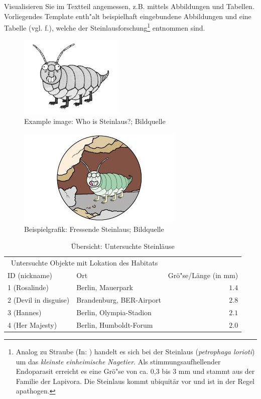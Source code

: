 Visualisieren Sie im Textteil angemessen, z.B. mittels Abbildungen und Tabellen. Vorliegendes Template enth"alt beispielhaft eingebundene Abbildungen und eine Tabelle (vgl. f.), welche der Steinlausforschung\footnote{Analog zu Straube (In: \autocite{pschy}) handelt es sich bei der Steinlaus (\textit{petrophaga lorioti}) um das \frqq \textit{kleinste einheimische Nagetier}\flqq. Als stimmungsaufhellender Endoparasit erreicht es eine Gr\"o"se von ca. 0,3 bis 3 mm und stammt aus der Familie der Lapivora. Die Steinlaus kommt ubiquit\"ar vor und ist in der Regel apathogen.} entnommen sind.


\begin{figure}
\centering
\includegraphics{images/steinlaus.jpg}
  \caption{Example image: Who is Steinlaus?; Bildquelle \autocite{loriot}}
\end{figure}



\begin{figure}
\centering
\includegraphics{images/steinlaus2.jpg}
  \caption{Beispielgrafik: Fressende Steinlaus; Bildquelle \autocite{loriot2}}
\end{figure}

\begin{table}
\caption{\"Ubersicht: Untersuchte Steinl\"ause}
\centering
\begin{tabular}{llr}
\toprule
\multicolumn{2}{c}{Untersuchte Objekte mit Lokation des Habitats} \\
\cmidrule(r){1-2}
ID (nickname) & Ort & Gr\"o"se/L\"ange (in mm) \\
\midrule
1 (Rosalinde) & Berlin, Mauerpark & $1.4$ \\
2 (Devil in disguise) & Brandenburg, BER-Airport & $2.8$ \\
3 (Hannes) & Berlin, Olympia-Stadion & $2.1$ \\
4 (Her Majesty) & Berlin, Humboldt-Forum & $2.0$ \\
\bottomrule
\end{tabular}
\end{table}

